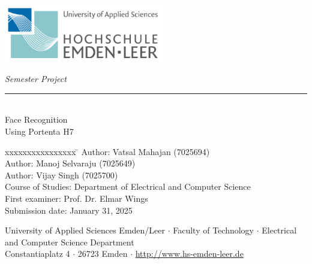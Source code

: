 %
%

\begin{titlepage}
    
    \begin{flushleft} 
        \includegraphics[width=7cm]{General/Logo}
    \end{flushleft} 
    
    \begin{flushright}
        \vspace{2cm}
        \LARGE \textsl{Semester Project}\\
        \rule{0.6\textwidth}{0.4pt} ~\\
        \vspace{0.5cm}
        \textsf{\LARGE Face Recognition}\\
        \textsf{\LARGE Using Portenta H7}
    \end{flushright}
    
    \vspace{3cm}
    \large
    \begin{tabbing}
        xxxxxxxxxxxxxxxx \= \kill
        Author: \> Vatsal Mahajan (7025694)\\
        Author: \> Manoj Selvaraju (7025649)\\
        Author: \> Vijay Singh (7025700)\\
        Course of Studies: \> Department of Electrical and Computer Science\\ [0.5cm]
        First examiner: \> Prof. Dr. Elmar Wings \\
        Submission date: \> January 31, 2025 \\
    \end{tabbing}
    
    \vspace{3cm}
    \small
    \begin{center}
        University of Applied Sciences Emden/Leer $\cdot$ 
        Faculty of Technology $\cdot$ 
        Electrical and Computer Science Department \\
        Constantiaplatz 4 $\cdot$ 
        26723 Emden $\cdot$ 
        \url{http://www.hs-emden-leer.de}
    \end{center}
    
\end{titlepage}
